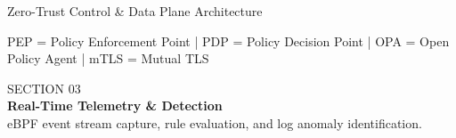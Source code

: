\documentclass[aspectratio=169, 10pt]{beamer}
\begin{document}
\begin{frame}{Zero-Trust Control \& Data Plane Architecture}
\begin{center}
  \end{center}
  \vspace{-6pt}
  \begin{center}
    {\tiny\color{textmuted}\ttfamily PEP = Policy Enforcement Point | PDP = Policy Decision Point | OPA = Open Policy Agent | mTLS = Mutual TLS}
  \end{center}
\end{frame}

\begin{frame}[plain]
  \vfill
  \begin{tcolorbox}[
    enhanced,
    colback=bgcard,
    colframe=cyberamber,
    arc=4pt,
    boxrule=1.2pt,
    left=15pt, right=15pt, top=15pt, bottom=15pt
  ]
    {\ttfamily\color{cyberamber}\large SECTION 03} \\[4pt]
    {\Huge\bfseries\color{textlight} Real-Time Telemetry \& Detection} \\[8pt]
    {\color{textmuted}\small eBPF event stream capture, rule evaluation, and log anomaly identification.}
  \end{tcolorbox}
  \vfill
\end{frame}
\end{document}
